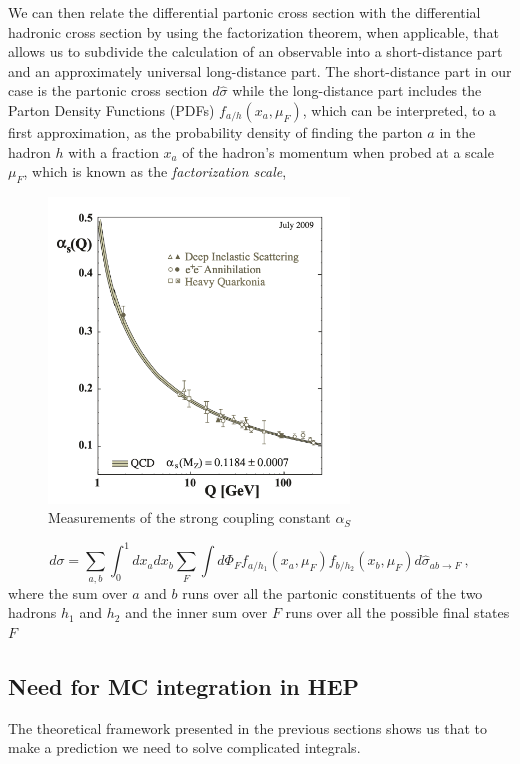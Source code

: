 \documentclass[../main/main.tex]{subfiles}
\begin{document}
We can then relate the differential partonic cross section with the differential hadronic cross section by using the factorization theorem, when 
applicable, that allows us to subdivide the calculation of an observable into a short-distance part and an approximately universal long-distance part.
The short-distance part in our case is the partonic cross section $d\hat{\sigma}$  while the long-distance part includes the Parton Density Functions (PDFs) $f_{a/h}(x_a,\mu_F)$, which can be interpreted, to a first approximation,  as the probability density of finding the parton $a$ in the hadron $h$ with a 
fraction $x_a$ of the hadron's  momentum when probed at a scale $\mu_F$, which is known as the \emph{factorization scale},
\begin{figure}[h]
	\centering
	\includegraphics[width=8cm]{../images/asymptotic_freedom.png}
	\caption{Measurements of the strong coupling constant $\alpha_S$}
	\label{alpha}
\end{figure}
\begin{equation}
	\label{QCD fact}
	d\sigma = \sum_{a,b}\int_0^1 dx_a dx_b \sum_F \int d\Phi_F f_{a/h_1}(x_a,\mu_F) f_{b/h_2}(x_b,\mu_F)  d\hat{\sigma}_{ab \rightarrow F} \ ,
\end{equation}
where the sum over $a$ and $b$ runs over all the partonic constituents of the two hadrons $h_1$ and $h_2$ and the inner sum over $F$ runs over all the possible final states $F$

\subsection{Need for MC integration in HEP}
The theoretical framework presented in the previous sections shows us that to make a prediction we need to solve complicated integrals. 
\end{document}
